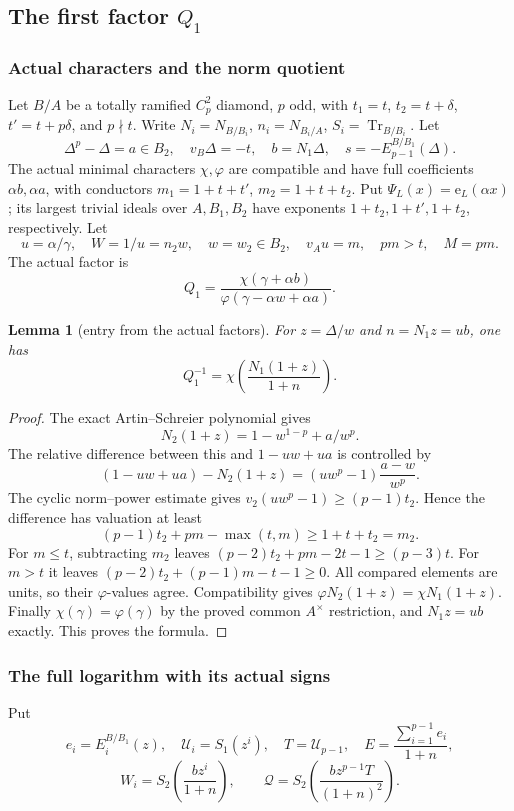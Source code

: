 \documentclass[11pt]{amsart}
\newtheorem{lemma}[theorem]{Lemma}
\theoremstyle{definition}
\theoremstyle{remark}
\newcommand{\Tr}{\operatorname{Tr}}
\begin{document}
\subsection{\texorpdfstring{The first factor $Q_1$}{The first factor Q1}}\label{O:sec:q1}
\subsubsection*{Actual characters and the norm quotient}
Let $B/A$ be a totally ramified $C_p^2$ diamond, $p$ odd, with
$t_1=t$, $t_2=t+\delta$, $t'=t+p\delta$, and $p\nmid t$.
Write $N_i=N_{B/B_i}$, $n_i=N_{B_i/A}$, $S_i=\Tr_{B/B_i}$.
Let
\[
 \Delta^p-\Delta=a\in B_2,\quad v_B\Delta=-t,\quad b=N_1\Delta,
 \quad s=-E_{p-1}^{B/B_1}(\Delta).
\]
The actual minimal characters $\chi,\varphi$ are compatible and have full
coefficients $\alpha b,\alpha a$, with conductors
$m_1=1+t+t'$, $m_2=1+t+t_2$. Put $\Psi_L(x)=\mathrm e_L(\alpha x)$;
its largest trivial ideals over $A,B_1,B_2$ have exponents
$1+t_2,1+t',1+t_2$, respectively.
Let
\[
 u=\alpha/\gamma,
 \quad W=1/u=n_2w,\quad w=w_2\in B_2,\quad v_Au=m,\quad pm>t,
 \quad M=pm.
\]
The actual factor is
\[
 Q_1=\frac{\chi(\gamma+\alpha b)}
           {\varphi(\gamma-\alpha w+\alpha a)}.
\]

\begin{lemma}[entry from the actual factors]\label{O:Q:entry}
For $z=\Delta/w$ and $n=N_1z=ub$, one has
\[
 Q_1^{-1}=\chi\!\left(\frac{N_1(1+z)}{1+n}\right).
\]
\end{lemma}
\begin{proof}
The exact Artin--Schreier polynomial gives
\[
 N_2(1+z)=1-w^{1-p}+a/w^p.
\]
The relative difference between this and
$1-uw+ua$ is controlled by
\[
 (1-uw+ua)-N_2(1+z)
 =(uw^p-1)\frac{a-w}{w^p}.
\]
The cyclic norm--power estimate gives
$v_2(uw^p-1)\ge(p-1)t_2$. Hence the difference has valuation at least
\[
 (p-1)t_2+pm-\max(t,m)\ge1+t+t_2=m_2.
\]
For $m\le t$, subtracting $m_2$ leaves
$(p-2)t_2+pm-2t-1\ge(p-3)t$.
For $m>t$ it leaves $(p-2)t_2+(p-1)m-t-1\ge0$.
All compared elements are units, so their $\varphi$-values agree.
Compatibility gives $\varphi N_2(1+z)=\chi N_1(1+z)$.
Finally $\chi(\gamma)=\varphi(\gamma)$ by the proved common
$A^\times$ restriction, and $N_1z=ub$ exactly. This proves the formula.
\end{proof}

\subsubsection*{The full logarithm with its actual signs}
Put
\[
 e_i=E_i^{B/B_1}(z),\quad \mathcal U_i=S_1(z^i),\quad T=\mathcal U_{p-1},\quad
 E=\frac{\sum_{i=1}^{p-1}e_i}{1+n},
\]
\[
 W_i=S_2\!\left(\frac{b z^i}{1+n}\right),\qquad
 \mathcal Q=S_2\!\left(\frac{b z^{p-1}T}{(1+n)^2}\right).
\]
\end{document}
